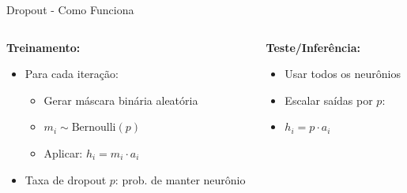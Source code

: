\documentclass{beamer}
\begin{document}
\begin{frame}{Dropout - Como Funciona}
\begin{columns}[T]
\begin{column}{0.48\textwidth}
\textbf{Treinamento:}
\begin{itemize}
    \item Para cada iteração:
    \begin{itemize}
        \item Gerar máscara binária aleatória
        \item $m_i \sim \text{Bernoulli}(p)$
        \item Aplicar: $h_i = m_i \cdot a_i$
    \end{itemize}
    \item Taxa de dropout $p$: prob. de manter neurônio
\end{itemize}
\end{column}

\begin{column}{0.48\textwidth}
\textbf{Teste/Inferência:}
\begin{itemize}
    \item Usar todos os neurônios
    \item Escalar saídas por $p$:
    \item $h_i = p \cdot a_i$
\end{itemize}

\end{column}
\end{columns}
\end{frame}
\end{document}
